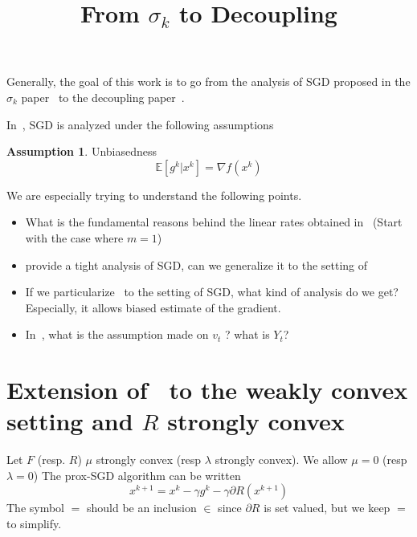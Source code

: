 \documentclass{article}
\title{From $\sigma_k$ to Decoupling}
\newcommand{\bE}{{\mathbb E}}
\theoremstyle{definition}
\newtheorem{assumption}{Assumption}
\begin{document}
\maketitle

\begin{abstract} 

\end{abstract}

Generally, the goal of this work is to go from the analysis of SGD proposed in the $\sigma_k$ paper~\cite{gorbunov2019unified} to the decoupling paper~\cite{mishchenko2019stochastic}.

In~\cite{gorbunov2019unified}, SGD is analyzed under the following assumptions 
\begin{assumption}
Unbiasedness
\begin{equation}
    \bE[g^k|x^k] = \nabla f(x^k)
\end{equation}
\end{assumption}

We are especially trying to understand the following points.
\begin{itemize}
    \item What is the fundamental reasons behind the linear rates obtained in~\cite{mishchenko2019stochastic} (Start with the case where $m=1$)
    \item \cite{gorbunov2019unified} provide a tight analysis of SGD, can we generalize it to the setting of~\cite{mishchenko2019stochastic}
    \item If we particularize~\cite{mishchenko2019stochastic} to the setting of SGD, what kind of analysis do we get? Especially, it allows biased estimate of the gradient.
    \item In~\cite{mishchenko2019stochastic}, what is the assumption made on $v_t$ ? what is $Y_t$?
\end{itemize}

\section{Extension of~\cite{gorbunov2019unified} to the weakly convex setting and $R$ strongly convex}
Let $F$ (resp. $R$) $\mu$ strongly convex (resp $\lambda$ strongly convex). We allow $\mu=0$ (resp $\lambda = 0$)  
The prox-SGD algorithm can be written
\begin{equation}
    x^{k+1} = x^k - \gamma g^k - \gamma \partial R(x^{k+1})
\end{equation}
The symbol $=$ should be an inclusion $\in$ since $\partial R$ is set valued, but we keep $=$ to simplify.
\end{document}

